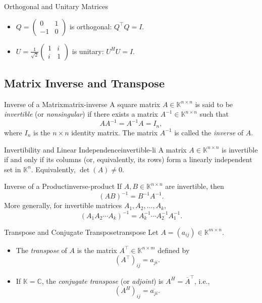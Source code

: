 \begin{example}{Orthogonal and Unitary Matrices}{}
    \begin{itemize}[nosep]
        \item \(Q = \begin{pmatrix} 0 & 1\\-1 & 0\end{pmatrix}\) is orthogonal: \(Q^\top Q = I\).
        \item \(U = \frac{1}{\sqrt{2}}\begin{pmatrix}1 & i\\i & 1\end{pmatrix}\) is unitary: \(U^H U = I\).
    \end{itemize}
\end{example}

\subsection{Matrix Inverse and Transpose}

\begin{definition}{Inverse of a Matrix}{matrix-inverse}
    A square matrix \(A \in \mathbb{K}^{n \times n}\) is said to be \emph{invertible} (or \emph{nonsingular}) if there exists a matrix \(A^{-1} \in \mathbb{K}^{n \times n}\) such that
    \[
        AA^{-1} = A^{-1}A = I_n,
    \]
    where \(I_n\) is the \(n \times n\) identity matrix. The matrix \(A^{-1}\) is called the \emph{inverse} of \(A\).
\end{definition}

\begin{property}{Invertibility and Linear Independence}{invertible-li}
    A matrix \(A \in \mathbb{K}^{n \times n}\) is invertible if and only if its columns (or, equivalently, its rows) form a linearly independent set in \(\mathbb{K}^n\). Equivalently, \(\det(A) \neq 0\).
\end{property}

\begin{remark}{Inverse of a Product}{inverse-product}
    If \(A, B \in \mathbb{K}^{n \times n}\) are invertible, then
    \[
        (AB)^{-1} = B^{-1}A^{-1}.
    \]
    More generally, for invertible matrices \(A_1, A_2, \ldots, A_k\),
    \[
        (A_1A_2\cdots A_k)^{-1} = A_k^{-1} \cdots A_2^{-1} A_1^{-1}.
    \]
\end{remark}

\begin{definition}{Transpose and Conjugate Transpose}{transpose}
    Let \(A = (a_{ij}) \in \mathbb{K}^{m \times n}\).
    \begin{itemize}[nosep]
        \item The \emph{transpose} of \(A\) is the matrix \(A^\top \in \mathbb{K}^{n \times m}\) defined by
              \[
                  (A^\top)_{ij} = a_{ji}.
              \]
        \item If \(\mathbb{K} = \mathbb{C}\), the \emph{conjugate transpose} (or \emph{adjoint}) is \(A^H = \overline{A}^\top\), i.e.,
              \[
                  (A^H)_{ij} = \overline{a_{ji}}.
              \]
    \end{itemize}
\end{definition}

